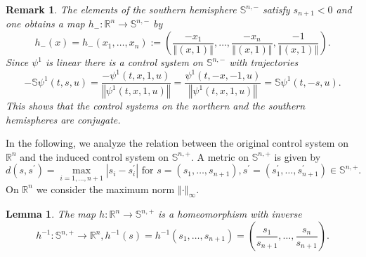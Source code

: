 \documentclass[preprint,12pt]{elsarticle}
\newtheorem{remark}{Remark}
\newtheorem{lemma}{Lemma}
\begin{document}
\begin{remark}
\label{Remark_southern}The elements of the southern hemisphere $\mathbb{S}%
^{n,-}$ satisfy $s_{n+1}<0$ and one obtains a map $h_{-}:\mathbb{R}%
^{n}\rightarrow\mathbb{S}^{n,-}$ by%
\[
h_{-}(x)=h_{-}(x_{1},\ldots,x_{n}):=\left(  \frac{-x_{1}}{\left\Vert
(x,1)\right\Vert },\ldots,\frac{-x_{n}}{\left\Vert (x,1)\right\Vert }%
,\frac{-1}{\left\Vert (x,1)\right\Vert }\right)  .
\]
Since $\psi^{1}$ is linear there is a control system on $\mathbb{S}^{n,-}$
with trajectories%
\[
-\mathbb{S}\psi^{1}(t,s,u)=\frac{-\psi^{1}(t,x,1,u)}{\left\Vert \psi
^{1}(t,x,1,u)\right\Vert }=\frac{\psi^{1}(t,-x,-1,u)}{\left\Vert \psi
^{1}(t,x,1,u)\right\Vert }=\mathbb{S}\psi^{1}(t,-s,u).
\]
This shows that the control systems on the northern and the southern
hemispheres are conjugate.
\end{remark}

In the following, we analyze the relation between the original control system
on $\mathbb{R}^{n}$ and the induced control system on $\mathbb{S}^{n,+}$. A
metric on $\mathbb{S}^{n,+}$ is given by%
\[
d(s,s^{\prime})=\max_{i=1,\ldots,n+1}\left\vert s_{i}-s_{i}^{\prime
}\right\vert \text{ for }s=(s_{1},\ldots,s_{n+1}),s^{\prime}=(s_{1}^{\prime
},\ldots,s_{n+1}^{\prime})\in\mathbb{S}^{n,+}.
\]
On $\mathbb{R}^{n}$ we consider the maximum norm $\left\Vert \cdot\right\Vert
_{\infty}$.

\begin{lemma}
\label{Lemma_h}The map $h:\mathbb{R}^{n}\rightarrow\mathbb{S}^{n,+}$ is a
homeomorphism with inverse%
\[
h^{-1}:\mathbb{S}^{n,+}\rightarrow\mathbb{R}^{n},h^{-1}(s)=h^{-1}(s_{1}%
,\ldots,s_{n+1})=\left(  \frac{s_{1}}{s_{n+1}},\ldots,\frac{s_{n}}{s_{n+1}%
}\right)  .
\]

\end{lemma}
\end{document}
